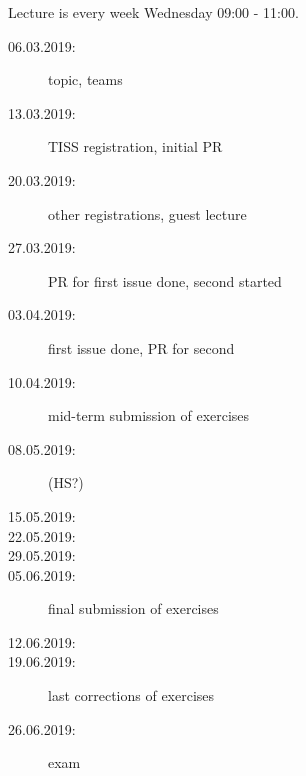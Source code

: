 


\date{03.04.2019}



\renewcommand{\enquote}[1]{\emph{``#1''}} %

\begin{frame}
	\titlepage
	\doclicenseThis
\end{frame}

\begin{frame}
	Lecture is every week Wednesday 09:00 - 11:00.

	\begin{description}
		\item[06.03.2019:] {\color{gray}topic, teams}
		\item[13.03.2019:] {\color{gray}TISS registration, initial PR}
		\item[20.03.2019:] {\color{gray}other registrations, guest lecture}
		\item[27.03.2019:] {\color{gray}PR for first issue done, second started}
		\item[03.04.2019:] {\color{red}first issue done, PR for second}
		\item[10.04.2019:] {\color{orange}mid-term submission of exercises}
		\item[08.05.2019:] (HS?)
		\item[15.05.2019:]
		\item[22.05.2019:]
		\item[29.05.2019:]
		\item[05.06.2019:] final submission of exercises
		\item[12.06.2019:]
		\item[19.06.2019:] last corrections of exercises
		\item[26.06.2019:] exam
	\end{description}
\end{frame}

